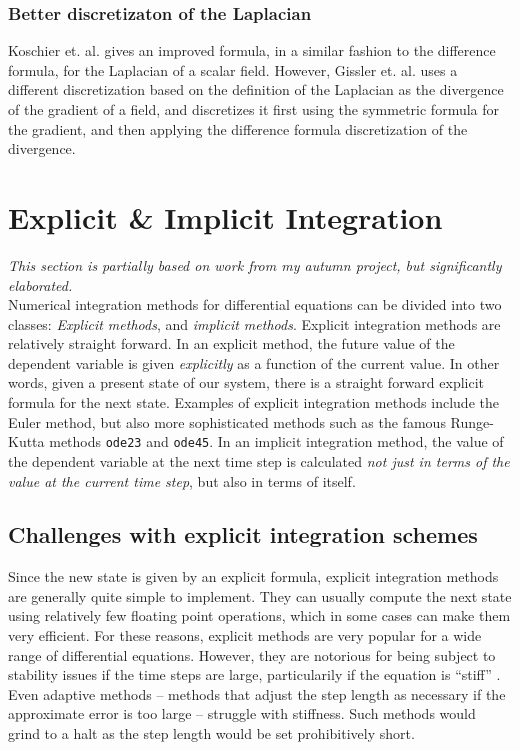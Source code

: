 \subsubsection*{Better discretizaton of the Laplacian}
Koschier et. al. gives an improved formula, in a similar fashion to the difference formula,
for the Laplacian of a scalar field.
However, Gissler et. al. uses a different discretization based on the definition
of the Laplacian as the divergence of the gradient of a field, and
discretizes it first using the symmetric formula for the gradient, and then
applying the difference formula discretization of the divergence.


\section{Explicit \& Implicit Integration}
\label{sec:int}
\textit{This section is partially based on work from my autumn
project, but significantly elaborated.}\\[.05em]

\noindent
Numerical integration methods for differential equations can be 
divided into two classes:
{\em Explicit methods}, and {\em implicit methods}.
Explicit integration methods are relatively straight forward.
In an explicit method, the future value of the dependent variable
is given {\em explicitly} as a function of the current value.
In other words, given a present state of our system, there is
a straight forward explicit formula for the next state.
Examples of explicit integration methods include the 
Euler method, but also more sophisticated methods such as the
famous Runge-Kutta methods \texttt{ode23} and \texttt{ode45}.
In an implicit integration method, the value of the dependent variable
at the next time step is calculated {\em not just in terms of the
value at the current time step}, but also in terms of itself.

\subsection{Challenges with explicit integration schemes}

Since the new state is given by an explicit formula, explicit integration
methods are generally quite simple to implement.
They can usually compute the next state using relatively few
floating point operations, which in some cases can make them very efficient.
For these reasons, explicit methods are very popular for a wide
range of differential equations.
However, they are notorious for being subject to stability issues
if the time steps are large, particularily if the equation is
``stiff'' \cite{ma2501ode}.
Even adaptive methods  -- methods that adjust the step length as necessary if
the approximate error is too large -- struggle with stiffness.
Such methods would grind to a halt as the step length would
be set prohibitively short.

